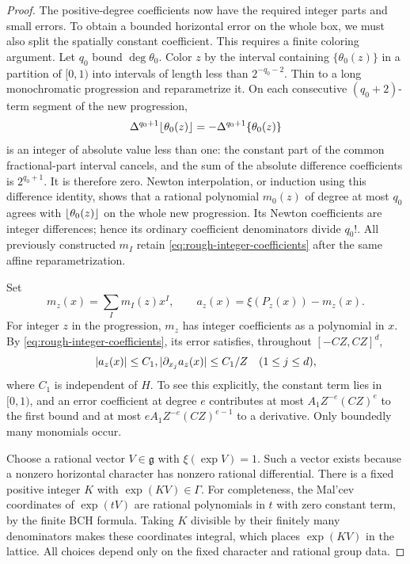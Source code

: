 \begin{proof}
The positive-degree coefficients now have the required integer parts
and small errors.  To obtain a bounded horizontal error on the whole
box, we must also split the spatially constant coefficient.  This
requires a finite coloring argument.  Let $q_0$ bound
$\deg\theta_0$.  Color $z$ by
the interval containing $\{\theta_0(z)\}$ in a partition of $[0,1)$
into intervals of length less than $2^{-q_0-2}$.  Thin to a long
monochromatic progression and reparametrize it.  On each consecutive
$(q_0+2)$-term segment of the new progression,
\[
 \Delta^{q_0+1}\lfloor\theta_0(z)\rfloor
       =-\Delta^{q_0+1}\{\theta_0(z)\}
\]
is an integer of absolute value less than one: the constant part of
the common fractional-part interval cancels, and the sum of the
absolute difference coefficients is $2^{q_0+1}$.  It is therefore zero.
Newton interpolation, or induction using this difference identity,
shows that a rational polynomial $m_0(z)$ of degree at most $q_0$
agrees with $\lfloor\theta_0(z)\rfloor$ on the whole new progression.
Its Newton coefficients are integer differences; hence its ordinary
coefficient denominators divide $q_0!$.  All previously constructed
$m_I$ retain \eqref{eq:rough-integer-coefficients} after the same
affine reparametrization.

Set
\begin{equation}
 m_z(x)=\sum_I m_I(z)x^I,
 \qquad a_z(x)=\xi(P_z(x))-m_z(x).
 \label{eq:rough-horizontal-splitting}
\end{equation}
For integer $z$ in the progression, $m_z$ has integer coefficients
as a polynomial in $x$.  By \eqref{eq:rough-integer-coefficients},
its error satisfies, throughout $[-CZ,CZ]^d$,
\begin{equation}
 \lvert a_z(x)\rvert\leq C_1,
 \lvert\partial_{x_j}a_z(x)\rvert\leq C_1/Z
 \quad(1\leq j\leq d),
 \label{eq:rough-slow-factor}
\end{equation}
where $C_1$ is independent of $H$.  To see this explicitly, the
constant term lies in $[0,1)$, and an error coefficient at degree
$e$ contributes at most $A_1Z^{-e}(CZ)^e$ to the first bound and at
most $eA_1Z^{-e}(CZ)^{e-1}$ to a derivative.  Only boundedly many
monomials occur.

Choose a rational vector $V\in\mathfrak g$ with
$\xi(\exp V)=1$.  Such a vector exists because a nonzero horizontal
character has nonzero rational differential.  There is a fixed
positive integer $K$ with $\exp(KV)\in\Gamma$.  For completeness,
the Mal'cev coordinates of $\exp(tV)$ are rational polynomials in
$t$ with zero constant term, by the finite BCH formula.  Taking $K$
divisible by their finitely many denominators makes these coordinates
integral, which places $\exp(KV)$ in the lattice.  All choices depend
only on the fixed character and rational group data.


\end{proof}

